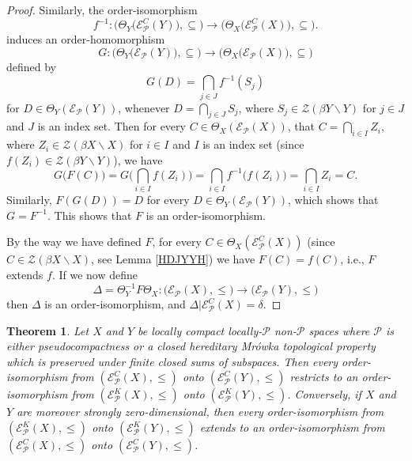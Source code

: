\documentclass{amsart}
\newtheorem{theorem}{Theorem}[section]
\theoremstyle{definition}
\theoremstyle{remark}
\theoremstyle{notation}
\numberwithin{equation}{section}
\begin{document}
\begin{proof}
Similarly, the order-isomorphism
\[f^{-1}:\big(\Theta_Y\big({\mathscr E}^C_{{\mathcal P}}(Y)\big),\subseteq\big)\rightarrow\big(\Theta_X\big({\mathscr E}^C_{{\mathcal P}}(X)\big),\subseteq\big).\]
induces an order-homomorphism
\[G:\big(\Theta_Y\big({\mathscr E}_{{\mathcal P}}(Y)\big),\subseteq\big)\rightarrow\big(\Theta_X\big({\mathscr E}_{{\mathcal P}}(X)\big),\subseteq\big)\]
defined by
\[G(D)= \bigcap_{j\in J}f^{-1}(S_j)\]
for $D\in \Theta_Y({\mathscr E}_{{\mathcal P}}(Y))$, whenever  $D=\bigcap_{j\in J}S_j$, where
$S_j\in {\mathscr Z}(\beta Y\backslash Y)$ for $j\in J$  and $J$ is an index set. Then for every  $C\in \Theta_X({\mathscr E}_{{\mathcal P}}(X))$,
that $C=\bigcap_{i\in I}Z_i$, where
$Z_i\in {\mathscr Z}(\beta X\backslash X)$ for $i\in I$ and  $I$ is an index set (since $f(Z_i)\in  {\mathscr Z}(\beta Y\backslash Y)$), we have
\[G\big(F(C)\big)=G\Big(\bigcap_{i\in I}f(Z_i)\Big)=\bigcap_{i\in I}f^{-1}\big(f(Z_i)\big)=\bigcap_{i\in I}Z_i=C.\]
Similarly, $F(G(D))=D$ for every $D\in \Theta_Y({\mathscr E}_{{\mathcal P}}(Y))$, which shows that $G=F^{-1}$. This shows that  $F$ is an  order-isomorphism.

By the way we have defined $F$, for every $C\in \Theta_X({\mathscr E}^C_{{\mathcal P}}(X))$ (since $C\in {\mathscr Z}(\beta X\backslash X)$, see
Lemma  \ref{HDJYYH}) we have $F(C)=f(C)$, i.e., $F$ extends $f$. If we now define
\[\Delta=\Theta_Y^{-1}F\Theta_X:\big({\mathscr E}_{{\mathcal P}}(X),\leq\big)\rightarrow\big({\mathscr E}_{{\mathcal P}}(Y),\leq\big)\]
then $\Delta$ is an  order-isomorphism, and $\Delta|{\mathscr E}^C_{{\mathcal P}}(X)=\delta$.
\end{proof}

\begin{theorem}\label{HGFFD}
Let $X$ and $Y$ be locally compact locally-${\mathcal P}$ non-${\mathcal P}$  spaces  where  ${\mathcal P}$ is either pseudocompactness or a
closed hereditary Mr\'{o}wka topological property which is preserved under  finite closed sums of subspaces.
Then every  order-isomorphism from
$({\mathscr E}^C_{{\mathcal P}}(X),\leq)$ onto $({\mathscr E}^C_{{\mathcal P}}(Y),\leq)$ restricts to an order-isomorphism
from $({\mathscr E}^K_{{\mathcal P}}(X),\leq)$ onto $({\mathscr E}^K_{{\mathcal P}}(Y),\leq)$.
Conversely, if $X$ and $Y$ are moreover  strongly zero-dimensional, then every order-isomorphism
from $({\mathscr E}^K_{{\mathcal P}}(X),\leq)$ onto $({\mathscr E}^K_{{\mathcal P}}(Y),\leq)$ extends to an order-isomorphism
from $({\mathscr E}^C_{{\mathcal P}}(X),\leq)$ onto $({\mathscr E}^C_{{\mathcal P}}(Y),\leq)$.
\end{theorem}
\end{document}
